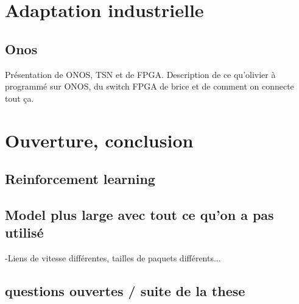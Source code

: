 \documentclass[a4paper,10pt]{article}
\begin{document}
\section{Adaptation industrielle}
\subsection{Onos}
Présentation de ONOS, TSN et de FPGA. Description de ce qu'olivier à programmé sur ONOS, du switch FPGA de brice et de comment on connecte tout ça. 

\section{Ouverture, conclusion}

\subsection{Reinforcement learning}
\subsection{Model plus large avec tout ce qu'on a pas utilisé}
-Liens de vitesse différentes, tailles de paquets différents...
\subsection{questions ouvertes / suite de la these}



\end{document}
